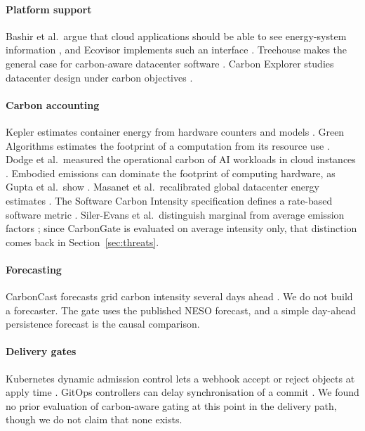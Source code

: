 \documentclass[journal]{IEEEtran}
\begin{document}
\paragraph{Platform support} Bashir et al.\ argue that cloud applications should be able to see energy-system information \cite{bashir2021enabling}, and Ecovisor implements such an interface \cite{souza2023ecovisor}. Treehouse makes the general case for carbon-aware datacenter software \cite{anderson2022treehouse}. Carbon Explorer studies datacenter design under carbon objectives \cite{acun2023carbon}.

\paragraph{Carbon accounting} Kepler estimates container energy from hardware counters and models \cite{amaral2023kepler}. Green Algorithms estimates the footprint of a computation from its resource use \cite{lannelongue2021green}. Dodge et al.\ measured the operational carbon of AI workloads in cloud instances \cite{dodge2022measuring}. Embodied emissions can dominate the footprint of computing hardware, as Gupta et al.\ show \cite{gupta2021chasing}. Masanet et al.\ recalibrated global datacenter energy estimates \cite{masanet2020recalibrating}. The Software Carbon Intensity specification defines a rate-based software metric \cite{gsfsci}. Siler-Evans et al.\ distinguish marginal from average emission factors \cite{siler2012marginal}; since CarbonGate is evaluated on average intensity only, that distinction comes back in Section~\ref{sec:threats}.

\paragraph{Forecasting} CarbonCast forecasts grid carbon intensity several days ahead \cite{maji2022carboncast}. We do not build a forecaster. The gate uses the published NESO forecast, and a simple day-ahead persistence forecast is the causal comparison.

\paragraph{Delivery gates} Kubernetes dynamic admission control lets a webhook accept or reject objects at apply time \cite{k8sadmission}. GitOps controllers can delay synchronisation of a commit \cite{argocd,fluxcd}. We found no prior evaluation of carbon-aware gating at this point in the delivery path, though we do not claim that none exists.
\end{document}
